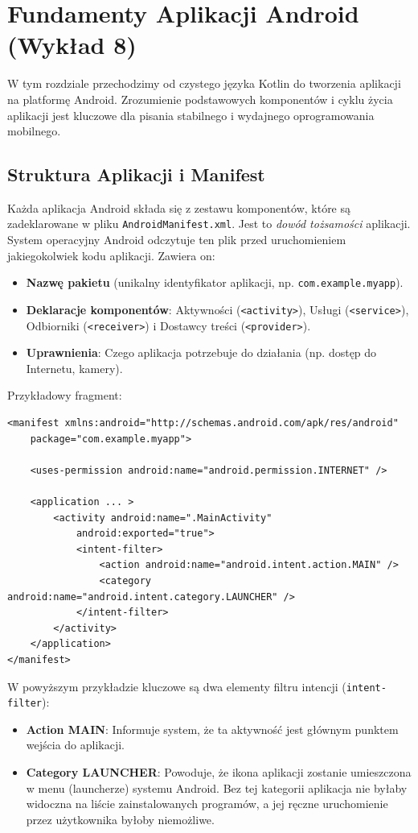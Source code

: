 \chapter{Fundamenty Aplikacji Android (Wykład 8)}

W tym rozdziale przechodzimy od czystego języka Kotlin do tworzenia aplikacji na platformę Android. Zrozumienie podstawowych komponentów i cyklu życia aplikacji jest kluczowe dla pisania stabilnego i wydajnego oprogramowania mobilnego.

\section{Struktura Aplikacji i Manifest}

Każda aplikacja Android składa się z zestawu komponentów, które są zadeklarowane w pliku \texttt{AndroidManifest.xml}. Jest to \textit{dowód tożsamości} aplikacji. System operacyjny Android odczytuje ten plik przed uruchomieniem jakiegokolwiek kodu aplikacji. Zawiera on:
\begin{itemize}
    \item \textbf{Nazwę pakietu} (unikalny identyfikator aplikacji, np. \texttt{com.example.myapp}).
    \item \textbf{Deklaracje komponentów}: Aktywności (\texttt{<activity>}), Usługi (\texttt{<service>}), Odbiorniki (\texttt{<receiver>}) i Dostawcy treści (\texttt{<provider>}).
    \item \textbf{Uprawnienia}: Czego aplikacja potrzebuje do działania (np. dostęp do Internetu, kamery).
\end{itemize}

Przykładowy fragment:
\begin{verbatim}
<manifest xmlns:android="http://schemas.android.com/apk/res/android"
    package="com.example.myapp">

    <uses-permission android:name="android.permission.INTERNET" />

    <application ... >
        <activity android:name=".MainActivity"
            android:exported="true">
            <intent-filter>
                <action android:name="android.intent.action.MAIN" />
                <category android:name="android.intent.category.LAUNCHER" />
            </intent-filter>
        </activity>
    </application>
</manifest>
\end{verbatim}


W powyższym przykładzie kluczowe są dwa elementy filtru intencji (\texttt{intent-filter}):
\begin{itemize}
    \item \textbf{Action MAIN}: Informuje system, że ta aktywność jest głównym punktem wejścia do aplikacji.
    \item \textbf{Category LAUNCHER}: Powoduje, że ikona aplikacji zostanie umieszczona w menu (launcherze) systemu Android. Bez tej kategorii aplikacja nie byłaby widoczna na liście zainstalowanych programów, a jej ręczne uruchomienie przez użytkownika byłoby niemożliwe.
\end{itemize}

